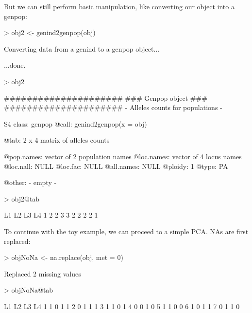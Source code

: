 \documentclass{article}
\begin{document}
\noindent But we can still perform basic manipulation, like converting
our object into a genpop:
\begin{Schunk}
\begin{Sinput}
> obj2 <- genind2genpop(obj)
\end{Sinput}
\begin{Soutput}
 Converting data from a genind to a genpop object... 

...done.
\end{Soutput}
\begin{Sinput}
> obj2
\end{Sinput}
\begin{Soutput}
       #####################
       ### Genpop object ### 
       #####################
- Alleles counts for populations - 

S4 class:  genpop
@call: genind2genpop(x = obj)

@tab:  2 x 4 matrix of alleles counts

@pop.names: vector of  2 population names
@loc.names: vector of  4 locus names
@loc.nall: NULL
@loc.fac: NULL
@all.names: NULL
@ploidy:  1
@type:  PA

@other: - empty -
\end{Soutput}
\begin{Sinput}
> obj2@tab
\end{Sinput}
\begin{Soutput}
  L1 L2 L3 L4
1  2  2  3  3
2  2  2  2  1
\end{Soutput}
\end{Schunk}

\noindent To continue with the toy example, we can proceed to a simple PCA.
NAs are first replaced:
\begin{Schunk}
\begin{Sinput}
> objNoNa <- na.replace(obj, met = 0)
\end{Sinput}
\begin{Soutput}
 Replaced 2 missing values 
\end{Soutput}
\begin{Sinput}
> objNoNa@tab
\end{Sinput}
\begin{Soutput}
  L1 L2 L3 L4
1  1  0  1  1
2  0  1  1  1
3  1  1  0  1
4  0  0  1  0
5  1  1  0  0
6  1  0  1  1
7  0  1  1  0
\end{Soutput}
\end{Schunk}
\end{document}
